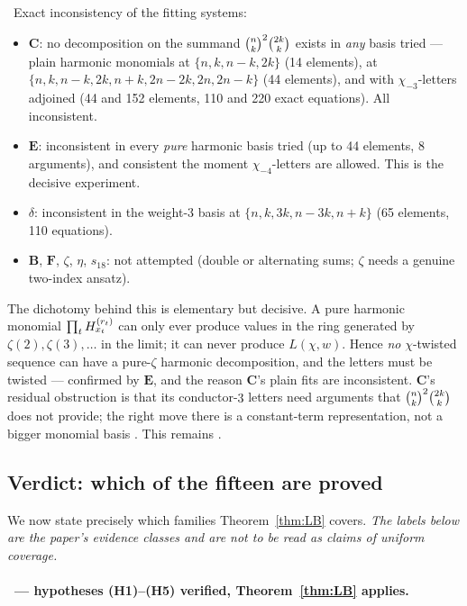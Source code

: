 \begin{observation}\label{obs:negatives}
\Verified\ Exact inconsistency of the fitting systems:
\begin{itemize}[leftmargin=1.4em]
\item $\mathbf C$: no decomposition on the summand $\binom{n}{k}^2\binom{2k}{k}$ exists in
  \emph{any} basis tried --- plain harmonic monomials at $\{n,k,n-k,2k\}$ (14 elements),
  at $\{n,k,n-k,2k,n+k,2n-2k,2n,2n-k\}$ (44 elements), and with $\chi_{-3}$-letters
  adjoined (44 and 152 elements, 110 and 220 exact equations). All inconsistent.
\item $\mathbf E$: inconsistent in every \emph{pure} harmonic basis tried (up to 44
  elements, 8 arguments), and consistent the moment $\chi_{-4}$-letters are allowed. This
  is the decisive experiment.
\item $\delta$: inconsistent in the weight-3 basis at $\{n,k,3k,n-3k,n+k\}$ (65 elements,
  110 equations).
\item $\mathbf B$, $\mathbf F$, $\zeta$, $\eta$, $s_{18}$: not attempted (double or
  alternating sums; $\zeta$ needs a genuine two-index ansatz).
\end{itemize}
\end{observation}

The dichotomy behind this is elementary but decisive. A pure harmonic monomial
$\prod_tH^{(r_t)}_{x_t}$ can only ever produce values in the ring generated by
$\zeta(2),\zeta(3),\dots$ in the limit; it can never produce $L(\chi,w)$. Hence \emph{no}
$\chi$-twisted sequence can have a pure-$\zeta$ harmonic decomposition, and the letters
must be twisted --- confirmed by $\mathbf E$, and the reason $\mathbf C$'s plain fits are
inconsistent. $\mathbf C$'s residual obstruction is that its conductor-$3$ letters need
arguments that $\binom{n}{k}^2\binom{2k}{k}$ does not provide; the right move there is a
constant-term representation, not a bigger monomial basis \cite{Gorodetsky}. This remains
\Open.

\subsection{Verdict: which of the fifteen are proved}
\label{ssec:verdict}

We now state precisely which families Theorem~\ref{thm:LB} covers. \emph{The labels below
are the paper's evidence classes and are not to be read as claims of uniform coverage.}

\paragraph{\Proved\ --- hypotheses \textup{(H1)--(H5)} verified, Theorem~\ref{thm:LB}
applies.}

